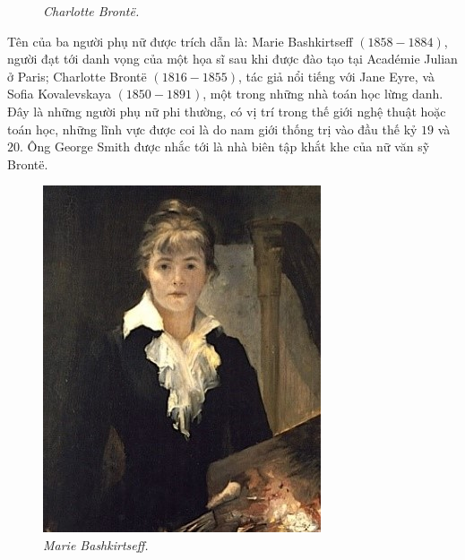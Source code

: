 \begin{multicols}{2}
\begin{figure}[H]
		\caption{\small\textit{\color{lichsutoanhoc}Charlotte Brontë.}}
		\vspace*{-10pt}
	\end{figure}
	Tên của ba người phụ nữ được trích dẫn là: Marie Bashkirtseff $(1858-1884)$, người đạt tới danh vọng của một họa sĩ sau khi được đào tạo tại Académie Julian ở Paris; Charlotte Brontë $(1816-1855)$, tác giả nổi tiếng với Jane Eyre, và Sofia Kovalevskaya $(1850-1891)$, một trong những nhà toán học lừng danh. Đây là những người phụ nữ phi thường, có vị trí trong thế giới nghệ thuật hoặc toán học, những lĩnh vực được coi là do nam giới thống trị vào đầu thế kỷ $19$ và $20$. Ông George Smith được nhắc tới là nhà biên tập khắt khe của nữ văn sỹ Brontë.
	\begin{figure}[H]
		\vspace*{-5pt}
		\centering
		\captionsetup{labelformat= empty, justification=centering}
		\includegraphics[width= 0.75\linewidth]{3}
		\caption{\small\textit{\color{lichsutoanhoc}Marie Bashkirtseff.}}
		\vspace*{-10pt}
	\end{figure}

\end{multicols}

